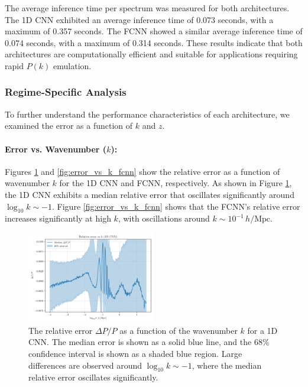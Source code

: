 \documentclass[twocolumn]{aastex631}
\begin{document}
The average inference time per spectrum was measured for both architectures. The 1D CNN exhibited an average inference time of 0.073 seconds, with a maximum of 0.357 seconds. The FCNN showed a similar average inference time of 0.074 seconds, with a maximum of 0.314 seconds. These results indicate that both architectures are computationally efficient and suitable for applications requiring rapid $P(k)$ emulation.

\subsubsection{Regime-Specific Analysis}

To further understand the performance characteristics of each architecture, we examined the error as a function of $k$ and $z$.

\paragraph{Error vs. Wavenumber ($k$):}

Figures \ref{fig:error_vs_k_cnn1d} and \ref{fig:error_vs_k_fcnn} show the relative error as a function of wavenumber $k$ for the 1D CNN and FCNN, respectively. As shown in Figure \ref{fig:error_vs_k_cnn1d}, the 1D CNN exhibits a median relative error that oscillates significantly around $\log_{10} k \sim -1$. Figure \ref{fig:error_vs_k_fcnn} shows that the FCNN's relative error increases significantly at high $k$, with oscillations around $k \sim 10^{-1} \, h/\mathrm{Mpc}$.

\begin{figure}[h]
    \centering
    \includegraphics[width=0.5\textwidth]{../Project4/plots/error_vs_k_cnn1d_3_1745408317.png}
    \caption{\label{fig:error_vs_k_cnn1d}The relative error $\Delta P/P$ as a function of the wavenumber $k$ for a 1D CNN. The median error is shown as a solid blue line, and the 68\% confidence interval is shown as a shaded blue region. Large differences are observed around $\log_{10} k \sim -1$, where the median relative error oscillates significantly.}
\end{figure}
\end{document}
